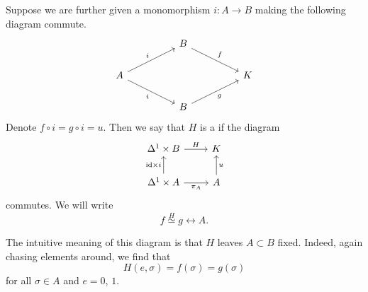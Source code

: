 \documentclass[main.tex]{subfiles}
\begin{document}
\begin{definition}
  \label{def:relative_homotopy}
  Suppose we are further given a monomorphism $i\colon A \to B$ making the following diagram commute.
  \begin{equation*}
    \begin{tikzcd}[column sep=huge]
      & B
      \arrow[dr, "f"]
      \\
      A
      \arrow[ur, "i"]
      \arrow[dr, swap, "i"]
      && K
      \\
      & B
      \arrow[ur, swap, "g"]
    \end{tikzcd}
  \end{equation*}
  Denote $f \circ i = g \circ i = u$. Then we say that $H$ is a  if the diagram
  \begin{equation*}
    \begin{tikzcd}
      \Delta^{1} \times B
      \arrow[r, "H"]
      & K
      \\
      \Delta^{1} \times A
      \arrow[r, swap, "\pi_{A}"]
      \arrow[u, "\id \times i"]
      & A
      \arrow[u, swap, "u"]
    \end{tikzcd}
  \end{equation*}
  commutes. We will write
  \begin{equation*}
    f \overset{H}{\simeq} g \rel{A}.
  \end{equation*}

  The intuitive meaning of this diagram is that $H$ leaves $A \subset B$ fixed. Indeed, again chasing elements around, we find that
  \begin{equation*}
    H(e, \sigma) = f(\sigma) = g(\sigma)
  \end{equation*}
  for all $\sigma \in A$ and $e = 0$, $1$.

\end{definition}
\end{document}
